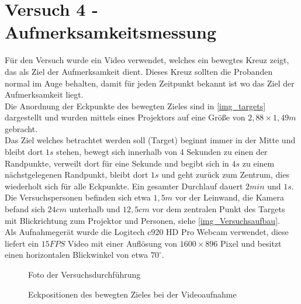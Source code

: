 \section{Versuch 4 - Aufmerksamkeitsmessung}
\label{VideoAnalyse}
Für den Versuch wurde ein Video verwendet, welches ein bewegtes Kreuz zeigt, das als Ziel der Aufmerksamkeit dient. Dieses Kreuz sollten die Probanden normal im Auge behalten, damit für jeden Zeitpunkt bekannt ist wo das Ziel der Aufmerksamkeit liegt.\\
Die Anordnung der Eckpunkte des bewegten Zieles sind in \autoref{img_targets} dargestellt und wurden mittels eines Projektors auf eine Größe von $2,88 \times 1,49 m$ gebracht.\\
Das Ziel welches betrachtet werden soll (Target) beginnt immer in der Mitte und bleibt dort $1s$ stehen, bewegt sich innerhalb von 4 Sekunden zu einen der Randpunkte, verweilt dort für eine Sekunde und begibt sich in $4s$ zu einem nächstgelegenen Randpunkt, bleibt dort $1s$ und geht zurück zum Zentrum, dies wiederholt sich für alle Eckpunkte. Ein gesamter Durchlauf dauert $2min$ und $1s$.\\
Die Versuchspersonen befinden sich etwa $1,5m$ vor der Leinwand, die Kamera befand sich $24cm$ unterhalb und $12,5cm$ vor dem zentralen Punkt des Targets mit Blickrichtung zum Projektor und Personen, siehe \autoref{img_Versuchsaufbau}.\\
Als Aufnahmegerät wurde die Logitech c920 HD Pro Webcam verwendet, diese liefert ein $15FPS$ Video mit einer Auflösung von $1600\times 896$ Pixel und besitzt einen horizontalen Blickwinkel von etwa $70^\circ$.\\
\begin{figure}
	\centering
	\caption{Foto der Versuchsdurchführung}
	\label{img_Versuchsaufbau}
\end{figure}
\begin{figure}
\centering
{}
\caption{Eckpositionen des bewegten Zieles bei der Videoaufnahme}
\label{img_targets}
\end{figure}
